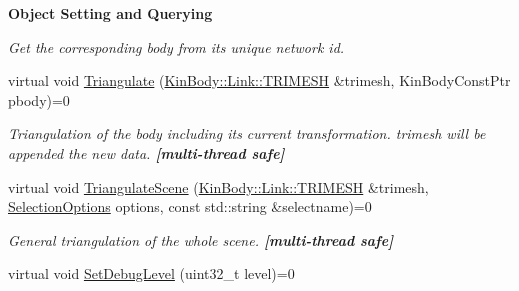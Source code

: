 \begin{Indent}{\bf Object Setting and Querying}
\begin{DoxyCompactItemize}
\begin{DoxyCompactList}\small\item\em Get the corresponding body from its unique network id. \item\end{DoxyCompactList}\item 
virtual void \hyperlink{classOpenRAVE_1_1EnvironmentBase_a19e34289d58ae5adeabd8fd431986dd5}{Triangulate} (\hyperlink{classOpenRAVE_1_1KinBody_1_1Link_1_1TRIMESH}{KinBody::Link::TRIMESH} \&trimesh, KinBodyConstPtr pbody)=0
\begin{DoxyCompactList}\small\item\em Triangulation of the body including its current transformation. trimesh will be appended the new data. {\bfseries \mbox{[}multi-\/thread safe\mbox{]}} \item\end{DoxyCompactList}\item 
virtual void \hyperlink{classOpenRAVE_1_1EnvironmentBase_a9773d98d124c6fcbfbcc1aa47ee4967e}{TriangulateScene} (\hyperlink{classOpenRAVE_1_1KinBody_1_1Link_1_1TRIMESH}{KinBody::Link::TRIMESH} \&trimesh, \hyperlink{classOpenRAVE_1_1EnvironmentBase_a0abab749a8f5d8ff38d62672ae03abee}{SelectionOptions} options, const std::string \&selectname)=0
\begin{DoxyCompactList}\small\item\em General triangulation of the whole scene. {\bfseries \mbox{[}multi-\/thread safe\mbox{]}} \item\end{DoxyCompactList}\end{DoxyCompactItemize}
\end{Indent}
\begin{Indent}{\bf }\par
{\em \label{_amgrpd41d8cd98f00b204e9800998ecf8427e}
 }\begin{DoxyCompactItemize}
\item 
virtual void \hyperlink{classOpenRAVE_1_1EnvironmentBase_a3b4f2f14db4059585686d8e457190df7}{SetDebugLevel} (uint32\_\-t level)=0
\end{DoxyCompactItemize}
\end{Indent}
